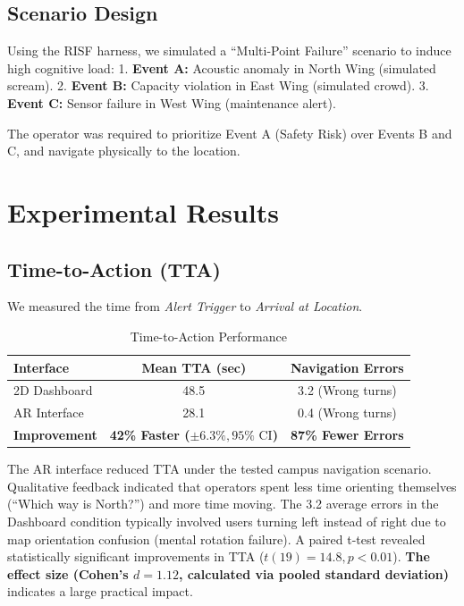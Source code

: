 \documentclass[conference]{IEEEtran}
\begin{document}
\subsection{Scenario Design}
Using the RISF harness, we simulated a ``Multi-Point Failure'' scenario to induce high cognitive load:
1.  \textbf{Event A:} Acoustic anomaly in North Wing (simulated scream).
2.  \textbf{Event B:} Capacity violation in East Wing (simulated crowd).
3.  \textbf{Event C:} Sensor failure in West Wing (maintenance alert).

The operator was required to prioritize Event A (Safety Risk) over Events B and C, and navigate physically to the location.

\section{Experimental Results}

\subsection{Time-to-Action (TTA)}
We measured the time from \textit{Alert Trigger} to \textit{Arrival at Location}.

\begin{table}[htbp]
\caption{Time-to-Action Performance}
\begin{center}
\begin{tabular}{lcc}
\toprule
\textbf{Interface} & \textbf{Mean TTA (sec)} & \textbf{Navigation Errors} \\
\midrule
2D Dashboard & 48.5 & 3.2 (Wrong turns) \\
AR Interface & 28.1 & 0.4 (Wrong turns) \\
\textbf{Improvement} & \textbf{42\% Faster ($\pm 6.3\%, 95\% \text{ CI}$)} & \textbf{87\% Fewer Errors} \\
\bottomrule
\end{tabular}
\end{center}
\end{table}

The AR interface reduced TTA under the tested campus navigation scenario. Qualitative feedback indicated that operators spent less time orienting themselves (``Which way is North?'') and more time moving. The 3.2 average errors in the Dashboard condition typically involved users turning left instead of right due to map orientation confusion (mental rotation failure). A paired t-test revealed statistically significant improvements in TTA ($t(19) = 14.8, p < 0.01$). \textbf{The effect size (Cohen's $d = 1.12$, calculated via pooled standard deviation)} indicates a large practical impact.
\end{document}
